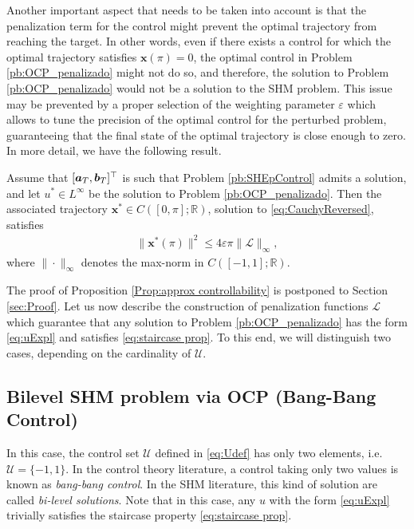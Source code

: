 \documentclass[twocolumn]{autart}    %
\begin{document}
Another important aspect that needs to be taken into account is that the penalization term for the control might prevent the optimal trajectory from reaching the target. In other words, even if there exists a control for which the optimal trajectory satisfies $\bm{x} (\pi) = 0$, the optimal control in Problem \ref{pb:OCP_penalizado} might not do so, and therefore, the solution to Problem \ref{pb:OCP_penalizado} would not be a solution to the SHM problem. This issue may be prevented by a proper selection of the weighting parameter $\varepsilon$ which allows to tune the precision of the optimal control for the perturbed problem, guaranteeing that the final state of the optimal trajectory is close enough to zero. In more detail, we have the following result.

\bigskip

\begin{proposition}\label{Prop:approx controllability}
Assume that $[\bm{a}_T,\bm{b}_T]^\top$ is such that Problem \ref{pb:SHEpControl} admits a solution, and let $u^\ast\in L^\infty$ be the solution to Problem \ref{pb:OCP_penalizado}. Then the associated trajectory $\bm{x}^\ast\in C([0,\pi];\mathbb{R})$, solution to \eqref{eq:CauchyReversed}, satisfies
\begin{align*} 
	\| \bm{x}^\ast (\pi)  \|^2 \leq  4 \varepsilon \pi \| \mathcal{L}\|_\infty,
\end{align*}
where $\| \cdot\|_\infty$ denotes the max-norm in $C([-1,1]; \mathbb{R})$.
\end{proposition}

The proof of Proposition \ref{Prop:approx controllability} is postponed to Section \ref{sec:Proof}. Let us now describe the construction of penalization functions $\mathcal{L}$ which guarantee that any solution to Problem \ref{pb:OCP_penalizado} has the form \eqref{eq:uExpl} and satisfies \eqref{eq:staircase prop}. To this end, we will distinguish two cases, depending on the cardinality of $\mathcal{U}$.

\subsection{Bilevel SHM problem via OCP (Bang-Bang Control)} 

In this case, the control set $\mathcal{U}$ defined in \eqref{eq:Udef} has only two elements, i.e.  $\mathcal{U}=\{-1,1\}$.
In the control theory literature, a control taking only two values is known as \emph{bang-bang control}. In the SHM literature, this kind of solution are called \textit{bi-level solutions}. Note that in this case, any $u$ with the form \eqref{eq:uExpl}  trivially satisfies the staircase property \eqref{eq:staircase prop}.
\end{document}
